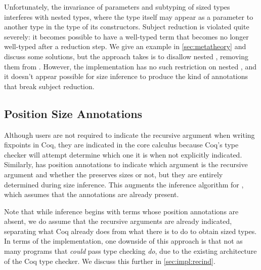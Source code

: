 Unfortunately, the invariance of parameters and subtyping of sized \coinductive types interferes with nested \coinductive types,
where the type itself may appear as a parameter to another type in the type of its constructors.
Subject reduction is violated quite severely: it becomes possible to have a well-typed term that becomes no longer well-typed after a reduction step.
We give an example in \autoref{sec:metatheory} and discuss some solutions,
but the approach \lang takes is to disallow nested \coinductives,
removing them from \CIChatminus.
However, the implementation has no such restriction on nested \coinductives,
and it doesn't appear possible for size inference to produce the kind of annotations that break subject reduction.

\subsection{Position Size Annotations}

Although users are not required to indicate the recursive argument when writing fixpoints in Coq,
they are indicated in the core calculus because Coq's type checker will attempt determine which one it is when not explicitly indicated.
Similarly, \lang has position annotations to indicate which argument is the recursive argument and whether the \cofixpoint preserves sizes or not,
but they are entirely determined during size inference.
This augments the inference algorithm for \CIChat,
which assumes that the annotations are already present.

Note that while inference begins with terms whose position annotations are absent,
we do assume that the recursive arguments are already indicated,
separating what Coq already does from what there is to do to obtain sized types.
In terms of the implementation, one downside of this approach is that not as many programs that \emph{could} pass type checking \emph{do},
due to the existing architecture of the Coq type checker.
We discuss this further in \autoref{sec:impl:recind}.


